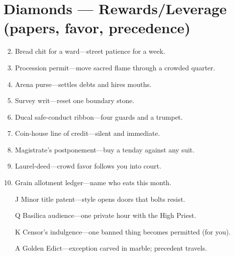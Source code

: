 \section*{Diamonds --- Rewards/Leverage (papers, favor, precedence)}
\begin{enumerate}
\setcounter{enumi}{1}
\item Bread chit for a ward---street patience for a week.
\item Procession permit---move sacred flame through a crowded quarter.
\item Arena purse---settles debts and hires mouths.
\item Survey writ---reset one boundary stone.
\item Ducal safe-conduct ribbon---four guards and a trumpet.
\item Coin-house line of credit---silent and immediate.
\item Magistrate's postponement---buy a tenday against any suit.
\item Laurel-deed---crowd favor follows you into court.
\item Grain allotment ledger---name who eats this month.
\item[J] Minor title patent---style opens doors that bolts resist.
\item[Q] Basilica audience---one private hour with the High Priest.
\item[K] Censor's indulgence---one banned thing becomes permitted (for you).
\item[A] Golden Edict---exception carved in marble; precedent travels.
\end{enumerate}

